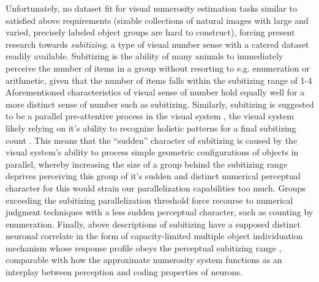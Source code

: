 \documentclass[twocolumn]{article}
\begin{document}
Unfortunately, no dataset fit for visual numerosity estimation tasks
similar to \citet{stoianov2012} satisfied above requirements (sizable
collections of natural images with large and varied, precisely labeled
object groups are hard to construct), forcing present research towards
\emph{subitizing}, a type of visual number sense with a catered
dataset readily available. Subitizing is the ability of many animals to
immediately perceive the number of items in a group without resorting to e.g. enumeration or arithmetic, given that the number of items falls within the
subitizing range of 1-4 \citep{kaufman1949, animalsnumericalcognition}
Aforementioned characteristics of visual sense of
number hold equally well for a more distinct sense of number such as
subitizing. Similarly, subitizing is suggested to be a parallel
pre-attentive process in the visual system
\citep[p.~57]{dehaene2011number}, the visual system likely relying on
it's ability to recognize holistic patterns for a final subitizing count
\citetext{\citealp{jansen2014role}; \citealp[p.~57]{dehaene2011number}; \citealp{piazza2002subitizing}}.
This means that the ``sudden'' character of subitizing is caused by the
visual system's ability to process simple geometric configurations of
objects in parallel, whereby increasing the size of a group behind the
subitizing range deprives perceiving this group of it's sudden and
distinct numerical perceptual character for this would strain our
parallelization capabilities too much. Groups exceeding the subitizing parallelization threshold force recourse to numerical judgment techniques with a less sudden perceptual character, such as counting by enumeration. Finally, above descriptions of subitizing have a supposed distinct neuronal correlate in the form of capacity-limited multiple object individuation mechanism whose response profile obeys the perceptual subitizing range \citep{poncet2016individuation}, comparable with how the approximate numerosity system functions as an interplay between perception and coding properties of neurons.\\
\end{document}
